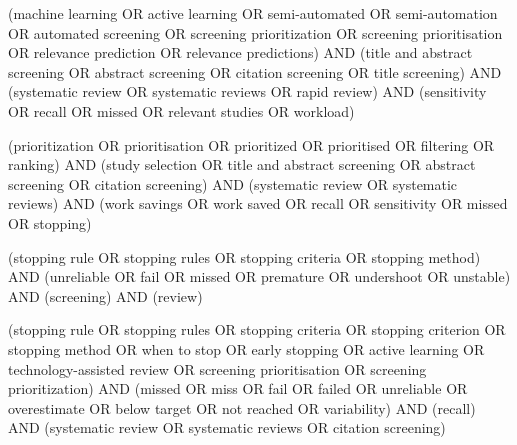 \begin{description}[style=nextline,font=\normalfont\bfseries]
\item[q1f, support query] {\footnotesize\ttfamily\raggedright (\textquotedbl{}machine learning\textquotedbl{} OR \textquotedbl{}active learning\textquotedbl{} OR \textquotedbl{}semi-automated\textquotedbl{} OR \textquotedbl{}semi-automation\textquotedbl{} OR \textquotedbl{}automated screening\textquotedbl{} OR \textquotedbl{}screening prioritization\textquotedbl{} OR \textquotedbl{}screening prioritisation\textquotedbl{} OR \textquotedbl{}relevance prediction\textquotedbl{} OR \textquotedbl{}relevance predictions\textquotedbl{}) AND (\textquotedbl{}title and abstract screening\textquotedbl{} OR \textquotedbl{}abstract screening\textquotedbl{} OR \textquotedbl{}citation screening\textquotedbl{} OR \textquotedbl{}title screening\textquotedbl{}) AND (\textquotedbl{}systematic review\textquotedbl{} OR \textquotedbl{}systematic reviews\textquotedbl{} OR \textquotedbl{}rapid review\textquotedbl{}) AND (sensitivity OR recall OR missed OR \textquotedbl{}relevant studies\textquotedbl{} OR workload)\par}
\item[q1g, support query] {\footnotesize\ttfamily\raggedright (prioritization OR prioritisation OR prioritized OR prioritised OR filtering OR ranking) AND (\textquotedbl{}study selection\textquotedbl{} OR \textquotedbl{}title and abstract screening\textquotedbl{} OR \textquotedbl{}abstract screening\textquotedbl{} OR \textquotedbl{}citation screening\textquotedbl{}) AND (\textquotedbl{}systematic review\textquotedbl{} OR \textquotedbl{}systematic reviews\textquotedbl{}) AND (\textquotedbl{}work savings\textquotedbl{} OR \textquotedbl{}work saved\textquotedbl{} OR recall OR sensitivity OR missed OR stopping)\par}
\item[q1x, counter query] {\footnotesize\ttfamily\raggedright (\textquotedbl{}stopping rule\textquotedbl{} OR \textquotedbl{}stopping rules\textquotedbl{} OR \textquotedbl{}stopping criteria\textquotedbl{} OR \textquotedbl{}stopping method\textquotedbl{}) AND (unreliable OR fail OR missed OR premature OR undershoot OR unstable) AND (screening) AND (review)\par}
\item[q1y, counter query] {\footnotesize\ttfamily\raggedright (\textquotedbl{}stopping rule\textquotedbl{} OR \textquotedbl{}stopping rules\textquotedbl{} OR \textquotedbl{}stopping criteria\textquotedbl{} OR \textquotedbl{}stopping criterion\textquotedbl{} OR \textquotedbl{}stopping method\textquotedbl{} OR \textquotedbl{}when to stop\textquotedbl{} OR \textquotedbl{}early stopping\textquotedbl{} OR \textquotedbl{}active learning\textquotedbl{} OR \textquotedbl{}technology-assisted review\textquotedbl{} OR \textquotedbl{}screening prioritisation\textquotedbl{} OR \textquotedbl{}screening prioritization\textquotedbl{}) AND (missed OR miss OR fail OR failed OR unreliable OR overestimate OR \textquotedbl{}below target\textquotedbl{} OR \textquotedbl{}not reached\textquotedbl{} OR variability) AND (recall) AND (\textquotedbl{}systematic review\textquotedbl{} OR \textquotedbl{}systematic reviews\textquotedbl{} OR \textquotedbl{}citation screening\textquotedbl{})\par}
\end{description}
